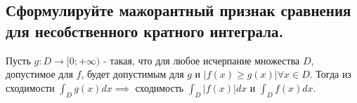 
\subsection{Сформулируйте мажорантный признак сравнения для несобственного кратного интеграла.}
Пусть $g: D \rightarrow [0;+\infty)$ - такая, что для любое исчерпание множества $D$, допустимое для $f$, будет допустимым для $g$ и $|f(x) \geq g(x)| \forall x \in D$. Тогда из сходимости $\int_{D} g(x) dx \implies$ сходимость $\int_{D} |f(x)| dx$ и $\int_{D} f(x) dx$.

